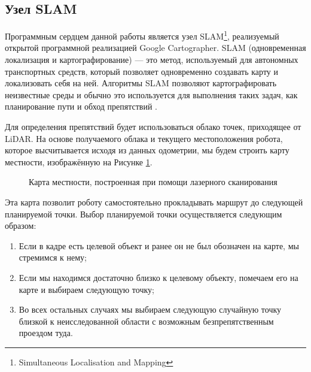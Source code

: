 \documentclass[12pt,a4paper]{scrartcl}
\begin{document}
			\subsection{Узел SLAM} \label{sec:Movement}
				Программным сердцем данной работы является узел SLAM\footnote{Simultaneous Localisation and Mapping}, реализуемый открытой программной реализацией Google Cartographer. SLAM (одновременная локализация и картографирование) — это метод, используемый для автономных транспортных средств, который позволяет одновременно создавать карту и локализовать себя на ней. Алгоритмы SLAM позволяют картографировать неизвестные среды и обычно это используется для выполнения таких задач, как планирование пути и обход препятствий \cite{bib:SLAMTheory}.
				
				Для определения препятствий будет использоваться облако точек, приходящее от LiDAR. На основе получаемого облака и текущего местоположения робота, которое высчитывается исходя из данных одометрии, мы будем строить карту местности, изображённую на Рисунке \ref{fig:Map}. 
				
				\begin{figure}[h]
					\caption{Карта местности, построенная при помощи лазерного сканирования}
					\label{fig:Map}
				\end{figure}
				
				Эта карта позволит роботу самостоятельно прокладывать маршрут до следующей планируемой точки. Выбор планируемой точки осуществляется следующим образом:
				
				\begin{enumerate}
					\item Если в кадре есть целевой объект и ранее он не был обозначен на карте, мы стремимся к нему;
					\item Если мы находимся достаточно близко к целевому объекту, помечаем его на карте и выбираем следующую точку;
					\item Во всех остальных случаях мы выбираем следующую случайную точку близкой к неисследованной области с возможным безпрепятственным проездом туда. 
				\end{enumerate}
					
\end{document}
